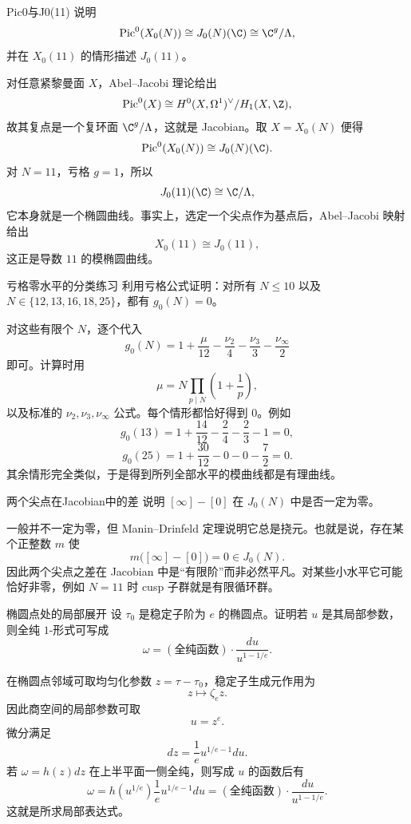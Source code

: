 \begin{problem}{Pic0与J0(11)}
说明
\[
\mathrm{Pic}^0(X_0(N))\cong J_0(N)(\C)\cong\C^g/\Lambda,
\]
并在 $X_0(11)$ 的情形描述 $J_0(11)$。
\end{problem}
\begin{solution}
对任意紧黎曼面 $X$，Abel--Jacobi 理论给出
\[
\mathrm{Pic}^0(X)\cong H^0(X,\Omega^1)^\vee/H_1(X,\Z),
\]
故其复点是一个复环面 $\C^g/\Lambda$，这就是 Jacobian。取 $X=X_0(N)$ 便得
\[
\mathrm{Pic}^0(X_0(N))\cong J_0(N)(\C).
\]
对 $N=11$，亏格 $g=1$，所以
\[
J_0(11)(\C)\cong\C/\Lambda,
\]
它本身就是一个椭圆曲线。事实上，选定一个尖点作为基点后，Abel--Jacobi 映射给出
\[
X_0(11)\cong J_0(11),
\]
这正是导数 $11$ 的模椭圆曲线。
\end{solution}

\begin{problem}{亏格零水平的分类练习}
利用亏格公式证明：对所有 $N\le10$ 以及 $N\in\{12,13,16,18,25\}$，都有 $g_0(N)=0$。
\end{problem}
\begin{solution}
对这些有限个 $N$，逐个代入
\[
g_0(N)=1+\frac{\mu}{12}-\frac{\nu_2}{4}-\frac{\nu_3}{3}-\frac{\nu_\infty}{2}
\]
即可。计算时用
\[
\mu=N\prod_{p\mid N}\left(1+\frac1p\right),
\]
以及标准的 $\nu_2,\nu_3,\nu_\infty$ 公式。每个情形都恰好得到 $0$。例如
\[
g_0(13)=1+\frac{14}{12}-\frac24-\frac23-1=0,
\]
\[
g_0(25)=1+\frac{30}{12}-0-0-\frac{7}{2}=0.
\]
其余情形完全类似，于是得到所列全部水平的模曲线都是有理曲线。
\end{solution}

\begin{problem}{两个尖点在Jacobian中的差}
说明 $[\infty]-[0]$ 在 $J_0(N)$ 中是否一定为零。
\end{problem}
\begin{solution}
一般并不一定为零，但 Manin--Drinfeld 定理说明它总是挠元。也就是说，存在某个正整数 $m$ 使
\[
m\bigl([\infty]-[0]\bigr)=0\in J_0(N).
\]
因此两个尖点之差在 Jacobian 中是“有限阶”而非必然平凡。对某些小水平它可能恰好非零，例如 $N=11$ 时 cusp 子群就是有限循环群。
\end{solution}

\begin{problem}{椭圆点处的局部展开}
设 $\tau_0$ 是稳定子阶为 $e$ 的椭圆点。证明若 $u$ 是其局部参数，则全纯 $1$-形式可写成
\[
\omega=(\text{全纯函数})\cdot \frac{du}{u^{1-1/e}}.
\]
\end{problem}
\begin{solution}
在椭圆点邻域可取均匀化参数 $z=\tau-\tau_0$，稳定子生成元作用为
\[
z\mapsto \zeta_e z.
\]
因此商空间的局部参数可取
\[
u=z^e.
\]
微分满足
\[
dz=\frac1e u^{1/e-1}du.
\]
若 $\omega=h(z)dz$ 在上半平面一侧全纯，则写成 $u$ 的函数后有
\[
\omega=h(u^{1/e})\frac1e u^{1/e-1}du=(\text{全纯函数})\cdot\frac{du}{u^{1-1/e}}.
\]
这就是所求局部表达式。
\end{solution}

